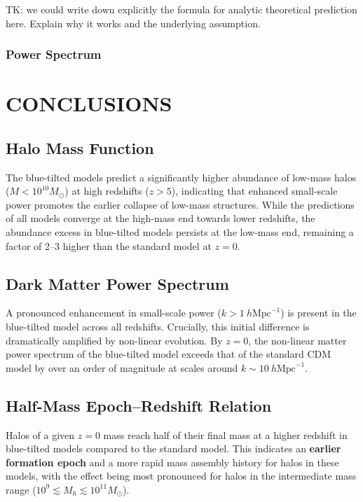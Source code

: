 \documentclass[
 reprint,
 superscriptaddress,
 nofootinbib,
 nobibnotes,
 amsmath,
 amssymb,
 aps,
 prd,
 floatfix,
 longbibliography
]{revtex4-1}
\begin{document}
{{{\color{red} TK: we could write down explicitly the formula for analytic theoretical prediction here. Explain why it works and the underlying assumption.}

\subsubsection{Power Spectrum\label{subsub:PS}}

\section{CONCLUSIONS}
\label{sec:conclusion}

\subsection{Halo Mass Function}
The blue-tilted models predict a significantly higher abundance of low-mass halos ($M < 10^{10} M_\odot$) at high redshifts ($z > 5$), indicating that enhanced small-scale power promotes the earlier collapse of low-mass structures. While the predictions of all models converge at the high-mass end towards lower redshifts, the abundance excess in blue-tilted models persists at the low-mass end, remaining a factor of 2--3 higher than the standard model at $z=0$.

\subsection{Dark Matter Power Spectrum}
A pronounced enhancement in small-scale power ($k > 1 \ h\mathrm{Mpc}^{-1}$) is present in the blue-tilted model across all redshifts. Crucially, this initial difference is dramatically amplified by non-linear evolution. By $z=0$, the non-linear matter power spectrum of the blue-tilted model exceeds that of the standard CDM model by over an order of magnitude at scales around $k \sim 10 \ h\mathrm{Mpc}^{-1}$.

\subsection{Half-Mass Epoch--Redshift Relation}
Halos of a given $z=0$ mass reach half of their final mass at a higher redshift in blue-tilted models compared to the standard model. This indicates an \textbf{earlier formation epoch} and a more rapid mass assembly history for halos in these models, with the effect being most pronounced for halos in the intermediate mass range ($10^9 \lesssim M_h \lesssim 10^{11} M_\odot$).

}}
\end{document}
